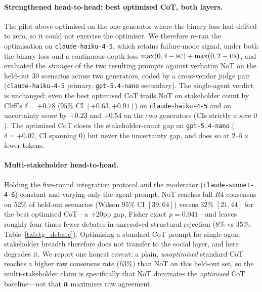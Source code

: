 \documentclass[11pt]{article}
\begin{document}
\paragraph{Strengthened head-to-head: best optimised CoT, both
layers.} The pilot above optimised on the one generator where the
binary loss had drifted to zero, so it could not exercise the
optimiser. We therefore re-ran the optimisation on
\texttt{claude-haiku-4-5}, which retains failure-mode signal,
under both the binary loss and a continuous depth loss
$\max(0, 4-\textsc{sc}) + \max(0, 2-\textsc{us})$, and evaluated
the \emph{stronger} of the two resulting prompts against verbatim
NoT on the held-out $30$ scenarios across two generators, coded
by a cross-vendor judge pair (\texttt{claude-haiku-4-5} primary,
\texttt{gpt-5.4-nano} secondary). The single-agent verdict is
unchanged: even the best optimised CoT trails NoT on stakeholder
count by Cliff's $\delta = +0.78$ ($95\%$ CI $[+0.63, +0.91]$) on
\texttt{claude-haiku-4-5} and on uncertainty score by $+0.23$ and
$+0.54$ on the two generators (CIs strictly above $0$). The
optimised CoT closes the stakeholder-count gap on
\texttt{gpt-5.4-nano} ($\delta = +0.07$, CI spanning $0$) but
never the uncertainty gap, and does so at $2$--$5{\times}$ fewer
tokens.

\paragraph{Multi-stakeholder head-to-head.} Holding the
five-round integration protocol and the moderator
(\texttt{claude-sonnet-4-6}) constant and varying only the agent
prompt, NoT reaches full $R4$ consensus on $52\%$ of held-out
scenarios (Wilson $95\%$ CI $[39, 64]$) versus $32\%$ $[21, 44]$
for the best optimised CoT---a $+20$pp gap, Fisher exact
$p = 0.041$---and leaves roughly four times fewer debates in
unresolved structural rejection ($8\%$ vs $35\%$;
Table~\ref{tab:tg_debate}). Optimising a standard-CoT prompt for
single-agent stakeholder breadth therefore does not transfer to
the social layer, and here degrades it. We report one honest
caveat: a plain, \emph{unoptimised} standard CoT reaches a higher
raw consensus rate ($63\%$) than NoT on this held-out set, so the
multi-stakeholder claim is specifically that NoT dominates the
\emph{optimised} CoT baseline---not that it maximises raw
agreement.
\end{document}
